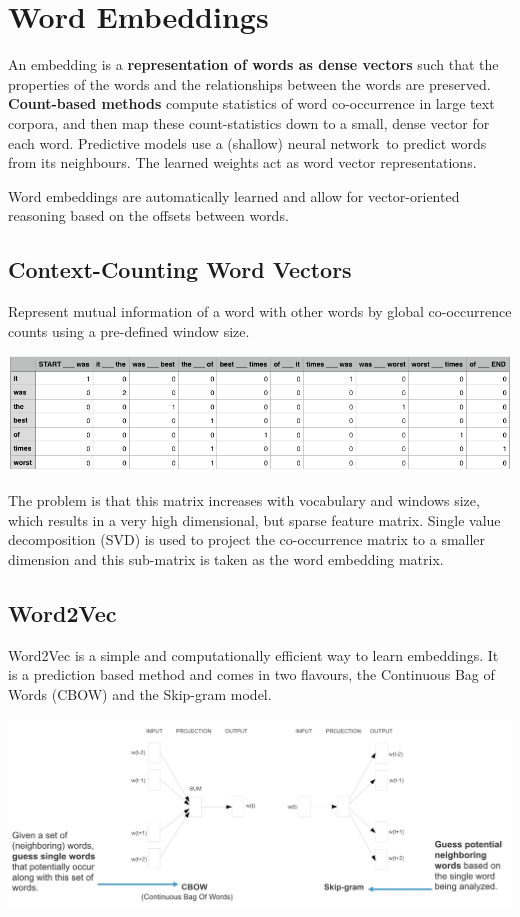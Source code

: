 \documentclass[11pt]{article}
\begin{document}
\section{Word Embeddings}
An embedding is a \textbf{representation of words as dense vectors} such that the properties of the words and the relationships between the words are preserved. \textbf{Count-based methods} compute statistics of word co-occurrence in large text corpora, and then map these count-statistics down to a small, dense vector for each word. Predictive models use a (shallow) neural network to predict
words from its neighbours. The learned weights act as word vector representations.

Word embeddings are automatically learned and allow for vector-oriented reasoning based on the offsets between words.

\subsection{Context-Counting Word Vectors}
Represent mutual information of a word with other words by global co-occurrence counts using a pre-defined window size.
\begin{center}
	\includegraphics[width=0.8\linewidth]{img/context_counting}
\end{center}
The problem is that this matrix increases with vocabulary and windows size, which results in a very high dimensional, but sparse feature matrix. Single value decomposition (SVD) is used to project the co-occurrence matrix to a smaller dimension and this sub-matrix is taken as the word embedding matrix.

\subsection{Word2Vec}
Word2Vec is a simple and computationally efficient way to learn embeddings. It is a prediction based method and comes in two flavours, the Continuous Bag of Words (CBOW) and the Skip-gram model.
\begin{center}
	\includegraphics[width=0.8\linewidth]{img/word2vec_model}
\end{center}
\end{document}
